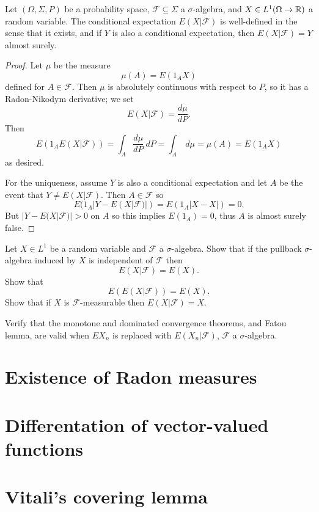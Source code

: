 \begin{corollary}
Let $(\Omega, \Sigma, P)$ be a probability space, $\mathcal F \subseteq \Sigma$ a $\sigma$-algebra, and $X \in L^{1}(\Omega \to \mathbb{R})$ a random variable.
The conditional expectation $E(X|\mathcal F)$ is well-defined in the sense that it exists, and if $Y$ is also a conditional expectation, then $E(X|\mathcal F) = Y$ almost surely.
\end{corollary}
\begin{proof}
Let $\mu$ be the measure
\[\mu(A) = E(1_{A} X)\]
defined for $A \in \mathcal F$.
Then $\mu$ is absolutely continuous with respect to $P$, so it has a Radon-Nikodym derivative; we set
\[E(X|\mathcal F) = \frac{d\mu}{dP}.\]
Then
\[E(1_{A} E(X|\mathcal F)) = \int_{A} \frac{d\mu}{dP} ~dP = \int_{A} ~d\mu = \mu(A) = E(1_{A} X)\]
as desired.

For the uniqueness, assume $Y$ is also a conditional expectation and let $A$ be the event that $Y \neq E(X|\mathcal F)$.
Then $A \in \mathcal F$ so
\[E(1_{A}|Y - E(X|\mathcal F)|) = E(1_{A}|X - X|) = 0.\]
But $|Y - E(X|\mathcal F)| > 0$ on $A$ so this implies $E(1_{A}) = 0$, thus $A$ is almost surely false.
\end{proof}

\begin{exercise}
Let $X \in L^{1}$ be a random variable and $\mathcal F$ a $\sigma$-algebra. Show that if the pullback $\sigma$-algebra induced by $X$ is independent of $\mathcal F$ then
\[E(X|\mathcal F) = E(X).\]
Show that
\[E(E(X|\mathcal F)) = E(X).\]
Show that if $X$ is $\mathcal F$-measurable then $E(X|\mathcal F) = X$.
\end{exercise}

\begin{exercise}
Verify that the monotone and dominated convergence theorems, and Fatou lemma, are valid when $EX_{n}$ is replaced with $E(X_{n}|\mathcal F)$, $\mathcal F$ a $\sigma$-algebra.
\end{exercise}

\section{Existence of Radon measures}

\section{Differentation of vector-valued functions}

\section{Vitali's covering lemma}

